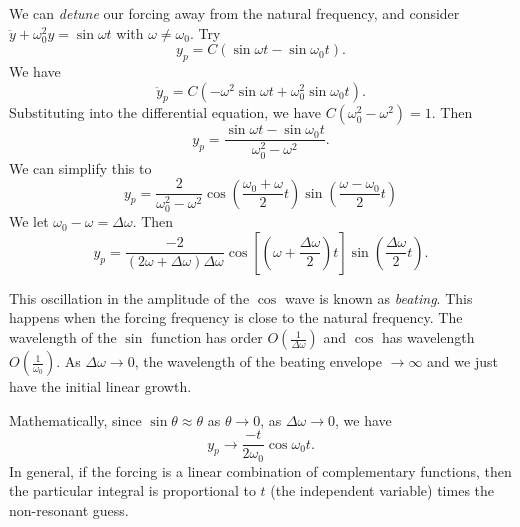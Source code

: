 \documentclass[a4paper]{article}
\begin{document}
We can \emph{detune} our forcing away from the natural frequency, and consider $\ddot y + \omega_0^2 y = \sin \omega t$ with $\omega \not= \omega_0$. Try
\[
  y_p = C(\sin \omega t - \sin \omega_0 t).
\]
We have
\[
  \ddot y_p = C(-\omega^2 \sin \omega t + \omega_0^2 \sin\omega_0 t).
\]
Substituting into the differential equation, we have $C(\omega_0^2 - \omega^2) = 1$. Then
\[
  y_p = \frac{\sin \omega t - \sin \omega_0t}{\omega_0^2 - \omega^2}.
\]
We can simplify this to
\[
  y_p = \frac{2}{\omega_0^2 - \omega^2} \cos \left(\frac{\omega_0 + \omega}{2}t\right) \sin \left(\frac{\omega - \omega_0}{2} t\right)
\]
We let $\omega_0 - \omega = \Delta \omega$. Then
\[
  y_p = \frac{-2}{(2\omega + \Delta \omega)\Delta \omega}\cos \left[\left(\omega + \frac{\Delta \omega}{2}\right)t\right] \sin \left(\frac{\Delta \omega}{2}t\right).
\]
\begin{center}
\end{center}
This oscillation in the amplitude of the $\cos$ wave is known as \emph{beating}. This happens when the forcing frequency is close to the natural frequency. The wavelength of the $\sin$ function has order $O(\frac{1}{\Delta \omega})$ and $\cos$ has wavelength $O(\frac{1}{\omega_0})$. As $\Delta\omega\to 0$, the wavelength of the beating envelope $\to \infty$ and we just have the initial linear growth.

Mathematically, since $\sin\theta \approx \theta$ as $\theta \to 0$, as $\Delta\omega \to 0$, we have
\[
  y_p\to \frac{-t}{2\omega_0}\cos\omega_0 t.
\]
In general, if the forcing is a linear combination of complementary functions, then the particular integral is proportional to $t$ (the independent variable) times the non-resonant guess.
\end{document}
